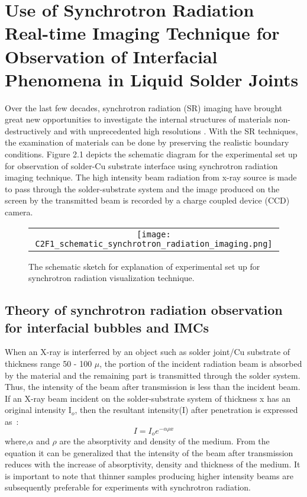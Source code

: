 \section{Use of Synchrotron Radiation Real-time Imaging Technique  for Observation of Interfacial Phenomena in Liquid Solder Joints} 
Over the last few decades, synchrotron radiation (SR) imaging have brought great new opportunities to investigate the internal structures of materials non-destructively  and with unprecedented high resolutions \cite{YCheng2013}. With the SR techniques, the examination of materials can be done by preserving the realistic boundary conditions. Figure 2.1 depicts the schematic diagram for the experimental set up for observation of solder-Cu substrate interface using synchrotron radiation imaging technique. The high intensity beam radiation from  x-ray source is made to pass through the solder-substrate system and the image produced on the screen by the transmitted beam is recorded by a charge coupled device (CCD) camera.
\begin{figure}[h]
\begin{center}
  \begin{tabular}{c}
  \texttt{[image: C2F1\_schematic\_synchrotron\_radiation\_imaging.png]}
  \end{tabular}
  \caption{The schematic sketch for explanation of experimental set up for synchrotron radiation visualization technique.}
\end{center}
\end{figure}
\subsection{Theory of synchrotron radiation observation for interfacial bubbles and IMCs}
When an X-ray is interferred by an object such as solder joint/Cu substrate of thickness range 50 - 100 $\mu$, the portion of the incident radiation beam is absorbed by the material and the remaining part is transmitted through the solder system. Thus,  the intensity of the beam after transmission is less than the incident beam. If an X-ray beam incident on the solder-substrate system of thickness x has an original intensity I$_o$, then the resultant intensity(I) after penetration is expressed as~\cite{LQu2014APSUSC}:
\begin{equation}
I = I_{o}e^{-\alpha\rho x}
\end{equation} 
where,$\alpha$ and $\rho$ are the absorptivity and density of the medium. From the equation it can be generalized that the intensity of the beam after transmission reduces with the increase of absorptivity, density and thickness of the medium. It is important to note that thinner samples producing higher intensity beams are subsequently preferable for experiments with synchrotron radiation. 
